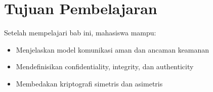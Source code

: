 \section*{Tujuan Pembelajaran}
Setelah mempelajari bab ini, mahasiswa mampu:
\begin{itemize}
\item Menjelaskan model komunikasi aman dan ancaman keamanan
\item Mendefinisikan confidentiality, integrity, dan authenticity
\item Membedakan kriptografi simetris dan asimetris
\end{itemize}
